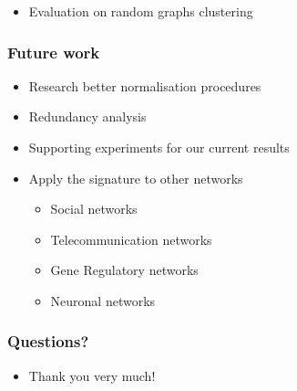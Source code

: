\documentclass[11pt,xcolor=table]{beamer}
\begin{document}
\begin{frame}
\begin{itemize}
\begin{figure}
  \end{figure}
  \item Evaluation on random graphs clustering \vfill
 \end{itemize}
 
\end{frame}

\begin{frame}
 \frametitle{Future work}
 
 \begin{itemize}
  \item Research better normalisation procedures  \vfill
  \item Redundancy analysis \vfill
  \item Supporting experiments for our current results \vfill
  \item Apply the signature to other networks \vfill
  \begin{itemize}
   \item Social networks \vfill
   \item Telecommunication networks \vfill
   \item Gene Regulatory networks \vfill
   \item Neuronal networks \vfill
  \end{itemize}

 \end{itemize}

\end{frame}

\begin{frame}
  \frametitle{Questions?}
 \vfill
 \begin{itemize}
  \item Thank you very much!
 \end{itemize}
 \vfill
 
\end{frame}
\end{document}
